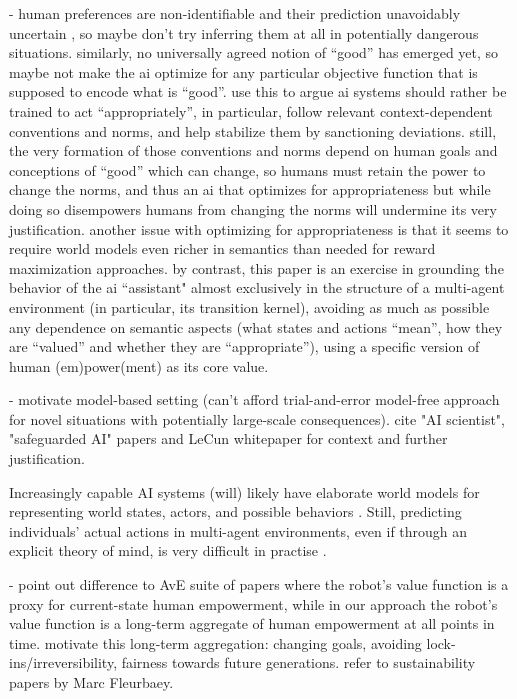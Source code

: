 \documentclass[letterpaper]{article} %
\begin{document}
- human preferences are non-identifiable \cite{cao2021identifiability,banerjee2011poor} and their prediction unavoidably uncertain \cite{baker2011bayesian}, so maybe don't try inferring them at all in potentially dangerous situations. similarly, no universally agreed notion of ``good'' has emerged yet, so maybe not make the ai optimize for any particular objective function that is supposed to encode what is ``good''. \cite{leibo2024theory} use this to argue ai systems should rather be trained to act ``appropriately'', in particular, follow relevant context-dependent conventions and norms, and help stabilize them by sanctioning deviations. still, the very formation of those conventions and norms depend on human goals and conceptions of ``good'' which can change, so humans must retain the power to change the norms, and thus an ai that optimizes for appropriateness but while doing so disempowers humans from changing the norms will undermine its very justification.
another issue with optimizing for appropriateness is that it seems to require world models even richer in semantics than needed for reward maximization approaches.
by contrast, this paper is an exercise in grounding the behavior of the ai  ``assistant" almost exclusively in the structure of a multi-agent environment (in particular, its transition kernel), avoiding as much as possible any dependence on semantic aspects (what states and actions ``mean'', how they are ``valued'' and whether they are ``appropriate''), using a specific version of human (em)power(ment) as its core value.

- motivate model-based setting (can't afford trial-and-error model-free approach for novel situations with potentially large-scale consequences). cite "AI scientist", "safeguarded AI" papers and LeCun whitepaper for context and further justification.

Increasingly capable AI systems (will) likely have elaborate world models for representing world states, actors, and possible behaviors \cite{ha2018world,lecun2022path,zhu2024sora,feng2025survey}. 
Still, predicting individuals' actual actions in multi-agent environments, even if through an explicit theory of mind, is very difficult in practise \cite{rudenko2020human,gu2024simpletom}.

- point out difference to AvE suite of papers where the robot's value function is a proxy for current-state human empowerment, while in our approach the robot's value function is a long-term aggregate of human empowerment at all points in time. motivate this long-term aggregation: changing goals, avoiding lock-ins/irreversibility, fairness towards future generations. refer to sustainability papers by Marc Fleurbaey.
\end{document}
